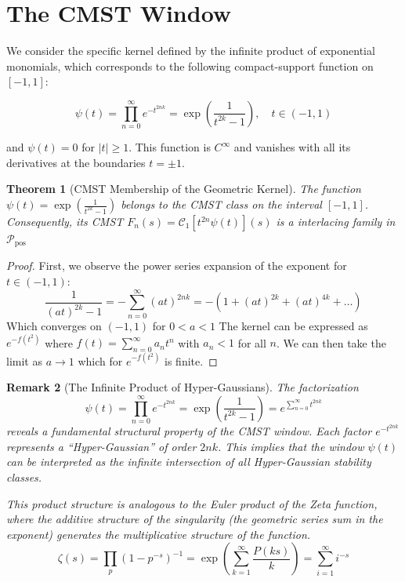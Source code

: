 \documentclass[11pt]{article}
\theoremstyle{breakdef}
\newtheorem{theorem}{Theorem}[section]
\newtheorem{remark}[theorem]{Remark}
\begin{document}
\section{The CMST Window}

We consider the specific kernel defined by the infinite product of exponential monomials, which corresponds to the following compact-support function on $[-1, 1]$:

\begin{equation}
    \psi(t) = \prod_{n=0}^{\infty} e^{-t^{2nk}} = \exp\left( \frac{1}{t^{2k}-1} \right), \quad t \in (-1, 1)
\end{equation}

and $\psi(t) = 0$ for $|t| \ge 1$. This function is $C^\infty$ and vanishes with all its derivatives at the boundaries $t = \pm 1$.

\begin{theorem}[CMST Membership of the Geometric Kernel]
The function $\psi(t) = \exp\left( \frac{1}{t^{2k}-1} \right)$ belongs to the CMST class on the interval $[-1, 1]$. Consequently, its CMST 
$F_n(s) = \mathcal{C}_1[t^{2n}\psi(t)](s)$ is a interlacing family in 
$\mathcal{P}_{\mathrm{pos}}$ 

\end{theorem}

\begin{proof}
First, we observe the power series expansion of the exponent for $t \in (-1, 1)$:
\begin{equation}
    \frac{1}{(a t)^{2k}-1} = -\sum_{n=0}^{\infty} (a t)^{2nk} = -(1 + (a t)^{2k} + (a t)^{4 k} + \dots)
\end{equation}
Which converges on $(-1,1)$ for $0< a < 1$
The kernel can be expressed as $e^{-f(t^2)}$ where $f(t) = \sum_{n=0}^{\infty} a_n t^n$ with $a_n < 1$ for all $n$. 
We can then take the limit as $a \to 1$ which for $e^{-f(t^2)}$ is finite.
\end{proof}

\begin{remark}[The Infinite Product of Hyper-Gaussians]
The factorization
\begin{equation}
\psi(t) = \prod_{n=0}^{\infty} e^{-t^{2nk}}  = \exp\left( \frac{1}{t^{2k}-1} \right) 
= e^{\sum _{n=0}^{\infty } t^{2 n k} }
\end{equation}
reveals a fundamental structural property of the CMST window. Each factor $e^{-t^{2nk}}$ represents a ``Hyper-Gaussian'' of order $2nk$. 
This implies that the window $\psi(t)$ can be interpreted as the infinite intersection of all Hyper-Gaussian stability classes. 

This product structure is analogous to the Euler product of the Zeta function, where the additive structure of the singularity (the geometric series sum in the exponent) generates the multiplicative structure of the function.
\begin{equation}
\zeta(s) = \prod_{p} \left(1 - p^{-s}\right)^{-1} = \exp\left( \sum_{k=1}^{\infty} \frac{P(ks)}{k} \right) = \sum_{i=1}^{\infty} i^{-s}
\end{equation}

\end{remark}
\end{document}
